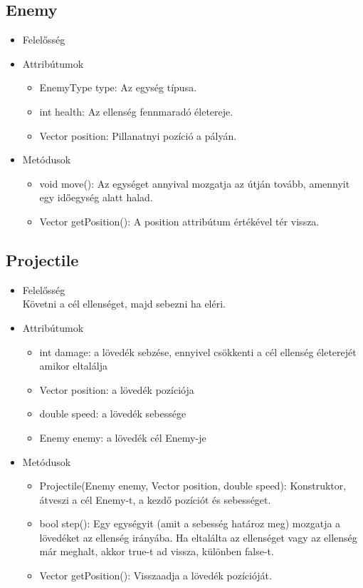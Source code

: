 \subsection{Enemy}
\begin{itemize}
\item Felelősség\\

\item Attribútumok\\
	\begin{itemize}
		\item EnemyType type: Az egység típusa.
		\item int health: Az ellenség fennmaradó életereje.
		\item Vector position: Pillanatnyi pozíció a pályán.
	\end{itemize}
\item Metódusok\\
	\begin{itemize}
		\item void move(): Az egységet annyival mozgatja az útján tovább, amennyit egy időegység alatt halad.
		\item Vector getPosition(): A position attribútum értékével tér vissza.
	\end{itemize}
\end{itemize}

\subsection{Projectile}
\begin{itemize}
\item Felelősség\\
Követni a cél ellenséget, majd sebezni ha eléri.
\item Attribútumok
	\begin{itemize}
		\item int damage: a lövedék sebzése, ennyivel csökkenti a cél ellenség életerejét amikor eltalálja
		\item Vector position: a lövedék pozíciója
		\item double speed: a lövedék sebessége
		\item Enemy enemy: a lövedék cél Enemy-je
	\end{itemize}
\item Metódusok
	\begin{itemize}
		\item Projectile(Enemy enemy, Vector position, double speed): Konstruktor, átveszi a cél Enemy-t, a kezdő pozíciót és sebességet.
		\item bool step(): Egy egységyit (amit a sebesség határoz meg) mozgatja a lövedéket az ellenség irányába. Ha eltalálta az ellenséget vagy az ellenség már meghalt, akkor true-t ad vissza, különben false-t.
		\item Vector getPosition(): Visszaadja a lövedék pozícióját.
	\end{itemize}
\end{itemize}

